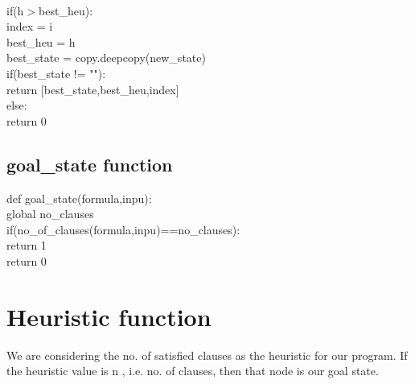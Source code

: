 \documentclass{article}
\begin{document}
        \vspace{2pt}
        \\ \hspace*{40pt}if(h$>$best\_heu):
        \vspace{2pt}
        \\ \hspace*{50pt}index = i
        \vspace{2pt}
        \\ \hspace*{50pt}best\_heu = h
        \vspace{2pt}
        \\ \hspace*{50pt}best\_state = copy.deepcopy(new\_state)
        \vspace{2pt}
        \\ \hspace*{20pt}if(best\_state != ""):
        \vspace{2pt}
        \\ \hspace*{30pt}return [best\_state,best\_heu,index]
        \vspace{2pt}
        \\ \hspace*{20pt}else:
        \vspace{2pt}
        \\ \hspace*{30pt}return 0
    
\subsection*{goal\_state function}
    \vspace{5pt}
    def goal\_state(formula,inpu):
        \vspace{5pt}
        \\ \hspace*{20pt}global no\_clauses
        \vspace{5pt}
        \\ \hspace*{20pt}if(no\_of\_clauses(formula,inpu)==no\_clauses):
        \vspace{5pt}
        \\ \hspace*{30pt} return 1
        \vspace{5pt}
        \\ \hspace*{20pt} return 0
\newpage
\section{Heuristic function}
\vspace{10pt}
We are considering the no. of satisfied clauses as the heuristic for our program.
If the heuristic value is n , i.e. no. of clauses, then that node is our goal state.
\end{document}
